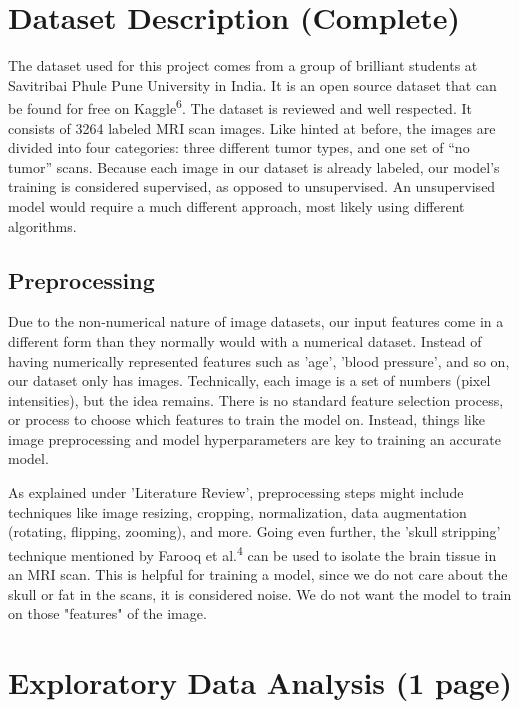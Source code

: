 \documentclass[conference]{IEEEtran}
\begin{document}
\section{\large Dataset Description (Complete)}

The dataset used for this project comes from a group of brilliant students at Savitribai Phule Pune University in India. It is an open source dataset that can be found for free on Kaggle\textsuperscript{6}. The dataset is reviewed and well respected. It consists of 3264 labeled MRI scan images. Like hinted at before, the images are divided into four categories: three different tumor types, and one set of “no tumor” scans. Because each image in our dataset is already labeled, our model's training is considered supervised, as opposed to unsupervised. An unsupervised model would require a much different approach, most likely using different algorithms.

\subsection{\large Preprocessing}

Due to the non-numerical nature of image datasets, our input features come in a different form than they normally would with a numerical dataset. Instead of having numerically represented features such as 'age', 'blood pressure', and so on, our dataset only has images. Technically, each image is a set of numbers (pixel intensities), but the idea remains. There is no standard feature selection process, or process to choose which features to train the model on. Instead, things like image preprocessing and model hyperparameters are key to training an accurate model.

As explained under 'Literature Review', preprocessing steps might include techniques like image resizing, cropping, normalization, data augmentation (rotating, flipping, zooming), and more. Going even further, the 'skull stripping' technique mentioned by Farooq et al.\textsuperscript{4} can be used to isolate the brain tissue in an MRI scan. This is helpful for training a model, since we do not care about the skull or fat in the scans, it is considered noise. We do not want the model to train on those "features" of the image.

\section{\large Exploratory Data Analysis (1 page)}
\end{document}
